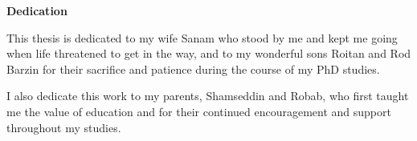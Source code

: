
\begin{center}\textbf{Dedication}\end{center}

This thesis is dedicated to my wife Sanam who stood by me and kept me going when life threatened to get in the way, and to my wonderful sons Roitan and Rod Barzin for their sacrifice and patience during the course of my PhD studies. 

I also dedicate this work to my parents, Shamseddin and Robab, who first taught me the value of education and for their continued encouragement and support throughout my studies.


\cleardoublepage
